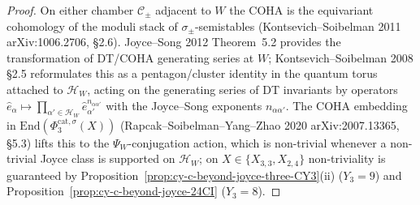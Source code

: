 \begin{proof}
On either chamber $\mathcal C_\pm$ adjacent to $W$ the COHA is the
equivariant cohomology of the moduli stack of $\sigma_\pm$-semistables
(Kontsevich--Soibelman 2011 arXiv:1006.2706, \S 2.6). Joyce--Song 2012
Theorem~5.2 provides the transformation of DT/COHA generating series
at $W$; Kontsevich--Soibelman 2008 \S 2.5 reformulates this as a
pentagon/cluster identity in the quantum torus attached to
$\mathcal H_W$, acting on the generating series of DT invariants by
operators $\hat{e}_\alpha \mapsto
\prod_{\alpha' \in \mathcal H_W} \hat{e}_{\alpha'}^{n_{\alpha \alpha'}}$
with the Joyce--Song exponents $n_{\alpha \alpha'}$. The COHA
embedding in $\mathrm{End}(\Phi_3^{\mathrm{cat},\sigma}(X))$
(Rapcak--Soibelman--Yang--Zhao 2020 arXiv:2007.13365, \S 5.3) lifts
this to the $\Psi_W$-conjugation action, which is non-trivial whenever
a non-trivial Joyce class is supported on $\mathcal H_W$; on
$X \in \{X_{3,3}, X_{2,4}\}$ non-triviality is guaranteed by
Proposition~\ref{prop:cy-c-beyond-joyce-three-CY3}(ii) ($Y_3 = 9$)
and Proposition~\ref{prop:cy-c-beyond-joyce-24CI} ($Y_3 = 8$).
\end{proof}

